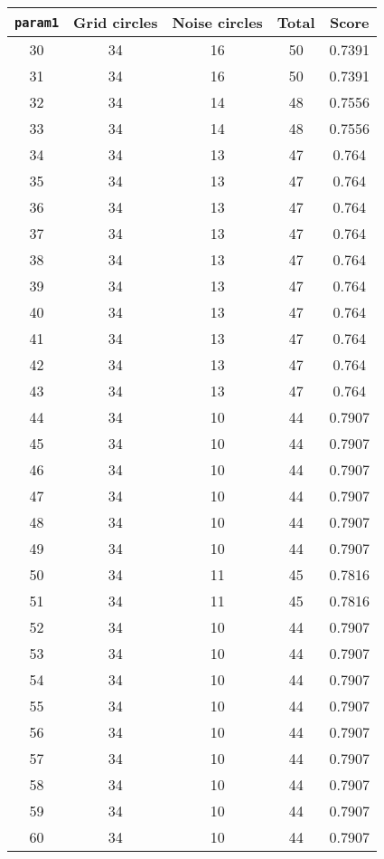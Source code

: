 \documentclass[letterpaper, 12pt]{article}
\begin{document}
\begin{longtable}{|c|c|c|c|c|}
\hline
\textbf{\texttt{param1}} & \textbf{Grid circles} & \textbf{Noise circles} & \textbf{Total} & \textbf{Score} \\
\hline
30 & 34 & 16 & 50 & 0.7391 \\
\hline
31 & 34 & 16 & 50 & 0.7391 \\
\hline
32 & 34 & 14 & 48 & 0.7556 \\
\hline
33 & 34 & 14 & 48 & 0.7556 \\
\hline
34 & 34 & 13 & 47 & 0.764 \\
\hline
35 & 34 & 13 & 47 & 0.764 \\
\hline
36 & 34 & 13 & 47 & 0.764 \\
\hline
37 & 34 & 13 & 47 & 0.764 \\
\hline
38 & 34 & 13 & 47 & 0.764 \\
\hline
39 & 34 & 13 & 47 & 0.764 \\
\hline
40 & 34 & 13 & 47 & 0.764 \\
\hline
41 & 34 & 13 & 47 & 0.764 \\
\hline
42 & 34 & 13 & 47 & 0.764 \\
\hline
43 & 34 & 13 & 47 & 0.764 \\
\hline
44 & 34 & 10 & 44 & 0.7907 \\
\hline
45 & 34 & 10 & 44 & 0.7907 \\
\hline
46 & 34 & 10 & 44 & 0.7907 \\
\hline
47 & 34 & 10 & 44 & 0.7907 \\
\hline
48 & 34 & 10 & 44 & 0.7907 \\
\hline
49 & 34 & 10 & 44 & 0.7907 \\
\hline
50 & 34 & 11 & 45 & 0.7816 \\
\hline
51 & 34 & 11 & 45 & 0.7816 \\
\hline
52 & 34 & 10 & 44 & 0.7907 \\
\hline
53 & 34 & 10 & 44 & 0.7907 \\
\hline
54 & 34 & 10 & 44 & 0.7907 \\
\hline
55 & 34 & 10 & 44 & 0.7907 \\
\hline
56 & 34 & 10 & 44 & 0.7907 \\
\hline
57 & 34 & 10 & 44 & 0.7907 \\
\hline
58 & 34 & 10 & 44 & 0.7907 \\
\hline
59 & 34 & 10 & 44 & 0.7907 \\
\hline
60 & 34 & 10 & 44 & 0.7907 \\

\end{longtable}
\end{document}
